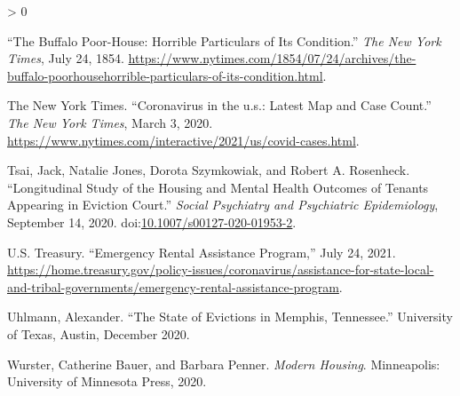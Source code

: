 \documentclass[
  openany]{book}
\newlength{\cslhangindent}
\newenvironment{CSLReferences}[2] %
 {%
  \setlength{\parindent}{0pt}
  \ifodd #1 \everypar{\setlength{\hangindent}{\cslhangindent}}\ignorespaces\fi
  \ifnum #2 > 0
  \setlength{\parskip}{#2\baselineskip}
  \fi
 }%
 {}
\begin{document}
\begin{CSLReferences}{1}{0}
\leavevmode\hypertarget{ref-thebuff1854}{}%
{``The Buffalo Poor-House: Horrible Particulars of Its Condition.''} \emph{The New York Times}, July 24, 1854. \url{https://www.nytimes.com/1854/07/24/archives/the-buffalo-poorhousehorrible-particulars-of-its-condition.html}.

\leavevmode\hypertarget{ref-thenewyorktimes2020}{}%
The New York Times. {``Coronavirus in the u.s.: Latest Map and Case Count.''} \emph{The New York Times}, March 3, 2020. \url{https://www.nytimes.com/interactive/2021/us/covid-cases.html}.

\leavevmode\hypertarget{ref-tsai2020}{}%
Tsai, Jack, Natalie Jones, Dorota Szymkowiak, and Robert A. Rosenheck. {``Longitudinal Study of the Housing and Mental Health Outcomes of Tenants Appearing in Eviction Court.''} \emph{Social Psychiatry and Psychiatric Epidemiology}, September 14, 2020. doi:\href{https://doi.org/10.1007/s00127-020-01953-2}{10.1007/s00127-020-01953-2}.

\leavevmode\hypertarget{ref-u.s.treasury2021}{}%
U.S. Treasury. {``Emergency Rental Assistance Program,''} July 24, 2021. \url{https://home.treasury.gov/policy-issues/coronavirus/assistance-for-state-local-and-tribal-governments/emergency-rental-assistance-program}.

\leavevmode\hypertarget{ref-uhlmann2020}{}%
Uhlmann, Alexander. {``The State of Evictions in Memphis, Tennessee.''} University of Texas, Austin, December 2020.

\leavevmode\hypertarget{ref-wurster2020}{}%
Wurster, Catherine Bauer, and Barbara Penner. \emph{Modern Housing}. Minneapolis: University of Minnesota Press, 2020.

\end{CSLReferences}
\end{document}
